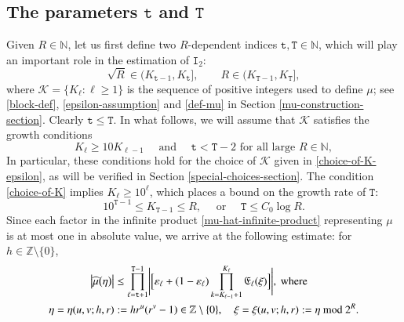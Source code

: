 \documentclass[12pt, twoside]{article}
\theoremstyle{definition}
\numberwithin{equation}{section}
\begin{document}
 \subsection{The parameters $\mathtt t$ and $\mathtt T$}
Given $R \in \mathbb N$, let us first define two $R$-dependent indices $\mathtt t, \mathtt T \in \mathbb N$, which will play an important role in the estimation of $\mathtt I_2$: 
\begin{equation} \label{t&T}
\sqrt{R} \in (K_{\mathtt t-1}, K_{\mathtt t} ], \qquad R \in (K_{\mathtt T-1}, K_{\mathtt T}], 
\end{equation} 
where $\mathcal K = \{K_{\ell} : \ell \geq 1\}$ is the sequence of positive integers used to define $\mu$; see \eqref{block-def}, \eqref{epsilon-assumption} and \eqref{def-mu} in Section \ref{mu-construction-section}. Clearly $\mathtt t \leq \mathtt T$. In what follows, we will assume that $\mathcal K$ satisfies the growth conditions 
\begin{equation} \label{choice-of-K}
K_{\ell} \geq 10 K_{\ell-1} \quad \text{ and } \quad \mathtt t < \mathtt T-2 \text{ for all large $R \in \mathbb N$},  
\end{equation} 
In particular, these conditions hold for the choice of $\mathcal K$ given in \eqref{choice-of-K-epsilon}, as will be verified in Section \ref{special-choices-section}. The condition \eqref{choice-of-K} implies $K_{\ell} \geq 10^{\ell}$, which places a bound on the growth rate of $\mathtt T$: 
\begin{equation} \label{T-growth} 
10^{\mathtt T-1} \leq K_{\mathtt T-1} \leq R, \quad \text{ or } \quad \mathtt T \leq C_0 \log R.    
\end{equation}    
\vskip0.1in 
\noindent Since each factor in the infinite product \eqref{mu-hat-infinite-product} representing $\mu$ is at most one in absolute value,  we arrive at the following estimate: for $h \in \mathbb Z \setminus \{0\}$,  
\begin{align} \label{mu-hat-infinite-product-2} 
\bigl| \widehat{\mu}\bigl(\eta \bigr)\bigr| &\leq \prod_{\ell=\mathtt t+1}^{\mathtt T-1}  \Biggl| \Bigl[ \varepsilon_{\ell} + (1 - \varepsilon_{\ell}) \prod_{k = K_{\ell-1}+1}^{K_{\ell}} \mathfrak E_{\ell}(\xi) \Bigr] \Biggr|, \text{ where }  \\ 
\eta = \eta(u, v; h, r)  &:= hr^u(r^v-1) \in \mathbb Z \setminus \{0\}, \quad \xi = \xi(u, v;h, r) := \eta \text{ mod } 2^{R}. \label{def-xi}
\end{align} 
\end{document}
